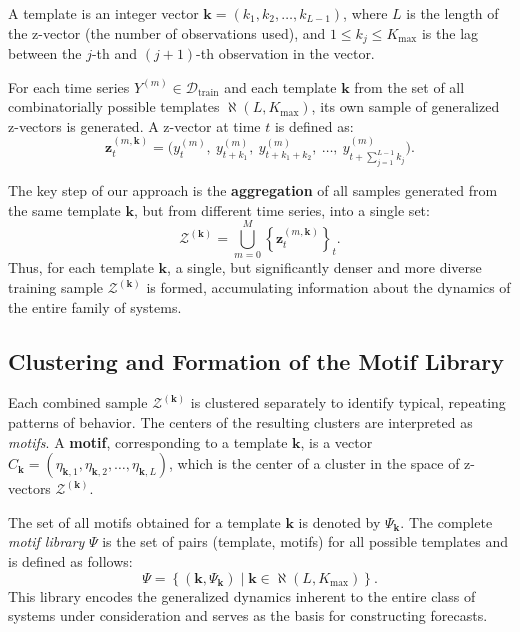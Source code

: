 \documentclass[a4paper,12pt]{extarticle}
\begin{document}
A template is an integer vector $\boldsymbol{k} = (k_1, k_2, \dots, k_{L-1})$,
 where $L$ is the length of the z-vector (the number of observations used), and $1 \le k_j \le K_{\max}$ is the lag between the $j$-th and $(j+1)$-th observation in the vector.

For each time series $Y^{(m)} \in \mathcal{D}_{\text{train}}$ and each template
 $\boldsymbol{k}$ from the set of all combinatorially possible templates $\aleph(L, K_{\max})$,
  its own sample of generalized z-vectors is generated. A z-vector at time $t$ is defined as:
\[
\mathbf{z}_{t}^{(m, \boldsymbol{k})} = \bigl(y^{(m)}_t,\ y^{(m)}_{t+k_1},\ y^{(m)}_{t+k_1+k_2},\ \dots,\ y^{(m)}_{t + \sum_{j=1}^{L-1} k_j}\bigr).
\]

The key step of our approach is the \textbf{aggregation} of all samples generated
 from the same template $\boldsymbol{k}$, but from different time series, into a single set:
\[
\mathcal{Z}^{(\boldsymbol{k})} = \bigcup_{m=0}^{M} \left\{ \mathbf{z}_{t}^{(m, \boldsymbol{k})} \right\}_{t}.
\]
Thus, for each template $\boldsymbol{k}$, a single, but significantly
 denser and more diverse training sample $\mathcal{Z}^{(\boldsymbol{k})}$ is formed,
  accumulating information about the dynamics of the entire family of systems.
\subsection{Clustering and Formation of the Motif Library}

Each combined sample $\mathcal{Z}^{(\boldsymbol{k})}$ is clustered separately
 to identify typical, repeating patterns of behavior. The centers of the resulting clusters
  are interpreted as \textit{motifs}.
A \textbf{motif}, corresponding to a template $\boldsymbol{k}$,
 is a vector $C_{\boldsymbol{k}} = (\eta_{\boldsymbol{k},1},
 \eta_{\boldsymbol{k},2}, \dots, \eta_{\boldsymbol{k},L})$, which is the
 center of a cluster in the space of z-vectors $\mathcal{Z}^{(\boldsymbol{k})}$.

The set of all motifs obtained for a template $\boldsymbol{k}$
is denoted by $\Psi_{\boldsymbol{k}}$. The complete \textit{motif library}
 $\Psi$ is the set of pairs (template, motifs) for all possible
  templates and is defined as follows:
\[
\Psi = \left\{ (\boldsymbol{k}, \Psi_{\boldsymbol{k}}) \mid \boldsymbol{k}
\in \aleph(L, K_{\max}) \right\}.
\]
This library encodes the generalized dynamics inherent to the entire class of systems
 under consideration and serves as the basis for constructing forecasts.
\end{document}
